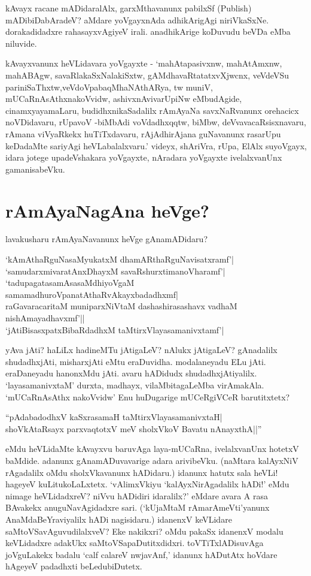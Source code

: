 kAvayx racane mADidaralAlx, garxMthavanunx pabilxSf ({\eng Publish}) mADibiDabAradeV? aMdare yoVgayxnAda adhikArigAgi niriVkaSxNe. dorakadidadxre rahasayxvAgiyeV irali. anadhikArige koDuvudu beVDa eMba niluvide. 

kAvayxvanunx heVLidavara yoVgayxte - `mahAtapasivxnw, mahAtAmxnw, mahABAgw, savaRlakaSxNalakiSxtw, gAMdhavaRtatatxvXjwcnx, veVdeVSu pariniSaThxtw,veVdoVpabaqMhaNAthARya, tw muniV, mUCaRnAsAthxnakoVvidw, ashivxnAvivarUpiNw eMbudAgide, cinamxyayamaLaru, budidhxnikaSadalilx rAmAyaNa savxNaRvanunx orehacicx noVDidavaru, rUpavoV -biMbAdi voVdadhxqqtw, biMbw, deVvavacaRsisxnavaru, rAmana viVyaRkekx huTiTxdavaru, rAjAdhirAjana guNavanunx  rasarUpu keDadaMte sariyAgi heVLabalalxvaru.' videyx, shAriVra, rUpa, ElAlx suyoVgayx, idara jotege upadeVshakara yoVgayxte, nAradara yoVgayxte ivelalxvanUnx gamanisabeVku. 

\section*{rAmAyaNagAna heVge?}

lavakusharu rAmAyaNavanunx heVge gAnamADidaru?

\begin{shloka}
`kAmAthaRguNasaMyukatxM dhamARthaRguNavisatxramf'|\label{212}\\
`samudarxmivaratAnxDhayxM savaRshurxtimanoVharamf'|\\
`tadupagatasamAsasaMdhiyoVgaM samamadhuroVpanatAthaRvAkayxbadadhxmf|\\
raGavaracaritaM muniparxNiVtaM dashashirasashavx vadhaM nishAmayadhavxmf'||\\
`jAtiBisasxpatxBibaRdadhxM taMtirxVlayasamanivxtamf'|
\end{shloka}

yAva jAti? haLiLx hadineMTu jAtigaLeV? nAlukx jAtigaLeV? gAnadalilx shudadhxjAti, misharxjAti eMtu eraDuvidha. modalaneyadu ELu jAti. eraDaneyadu hanonxMdu jAti. avaru hADidudx shudadhxjAtiyalilx. `layasamanivxtaM' durxta, madhayx, vilaMbitagaLeMba virAmakAla. `mUCaRnAsAthx nakoVvidw' Enu huDugarige mUCeRgiVCeR barutitxtetx? 

\begin{shloka}
``pAdabadodhxV kaSxrasamaH taMtirxVlayasamanivxtaH|\label{213}\\
shoVkAtaRsayx parxvaqtotxV meV sholxVkoV Bavatu nAnayxthA||''
\end{shloka}

eMdu heVLidaMte kAvayxvu baruvAga laya-mUCaRna, ivelalxvanUnx hotetxV baMdide. adanunx gAnamADuvavarige  adara arivibeVku. (naMtara kalAyxNiV rAgadalilx oMdu sholxVkavanunx hADidaru.) idanunx hatutx sala heVLi! hageyeV kuLitukoLaLxtetx. `vAlimxVkiyu `kalAyxNirAgadalilx hADi!' eMdu nimage heVLidadxreV? niVvu hADidiri idaralilx?' eMdare avara A rasa BAvakekx anuguNavAgidadxre sari. (`kUjaMtaM rAmarAmeVti'yanunx AnaMdaBeYraviyalilx hADi nagisidaru.) idanenxV keVLidare saMtoVSavAguvudilalxveV? Eke nakikxri? oMdu pakaSx idanenxV modalu keVLidadxre adakUkx saMtoVSapaDutitxdidxri. toVTiTxlADisuvAga joVguLakekx  badalu `calf calareV nwjavAnf,' idanunx hADutAtx hoVdare hAgeyeV padadhxti beLedubiDutetx. 

